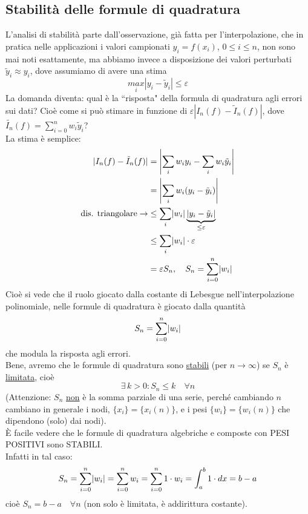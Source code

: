 \subsection{Stabilità delle formule di quadratura}
L'analisi di stabilità parte dall'osservazione, già fatta per l'interpolazione, che in pratica
nelle applicazioni i valori campionati $y_i=f(x_i)$, $0\leq i\leq n$, non sono mai noti esattamente, ma abbiamo invece a disposizione dei valori perturbati $\tilde{y}_i\approx y_i$, dove assumiamo di avere una stima 
\begin{equation*}
    \underset{i}{max}|y_i-\tilde{y}_i|\leq \varepsilon
\end{equation*}
La domanda diventa: qual è la ``risposta" della formula di quadratura agli errori sui dati? Cioè come si può stimare in funzione di $\varepsilon|I_n(f)-\tilde{I}_n(f)|$, dove $\tilde{I_n}(f)=\sum_{i=0}^nw_i\tilde{y}_i$?\\
La stima è semplice:
\[\begin{split}
    \abs{I_n(f) - \Tilde{I}_n(f)} & = \abs*{\sum_i w_i y_i - \sum_i w_i \Tilde{y}_i} \\
    & = \abs*{\sum_i w_i( y_i - \Tilde{y}_i)} \\
    \text{dis. triangolare} \to & \le \sum_i \abs*{w_i} \underbrace{\abs*{y_i - \Tilde{y}_i}}_{\le \varepsilon} \\
    & \le \sum_i \abs*{w_i} \cdot \varepsilon \\
    & = \varepsilon S_n, \quad S_n = \sum_{i=0}^n \abs*{w_i}
\end{split}\]
Cioè si vede che il ruolo giocato dalla costante di Lebesgue nell'interpolazione polinomiale, nelle formule di quadratura è giocato dalla quantità
\[S_n = \sum_{i=0}^n \abs*{w_i}\]
che modula la risposta agli errori.\\
Bene, avremo che le formule di quadratura sono \uline{stabili} (per $n \to \infty$) se $S_n$ è \uline{limitata}, cioè
\[\exists\, k > 0 : S_n \le k \quad \forall n\]
(Attenzione: $S_n$ \uline{non} è la somma parziale di una serie, perché cambiando $n$ cambiano in generale i nodi, $\{x_i\} = \{x_i(n)\}$, e i pesi $\{w_i\} = \{w_i(n)\}$ che dipendono (solo) dai nodi). \\
È facile vedere che le formule di quadratura algebriche e composte con PESI POSITIVI sono STABILI.\\
Infatti in tal caso:
\[S_n = \sum_{i=0}^n \abs*{w_i} = \sum_{i=0}^n w_i = \sum_{i=0}^n 1 \cdot w_i = \int_a^b 1 \cdot dx = b - a\]
cioè $S_n = b-a \quad \forall n$ (non solo è limitata, è addirittura costante).\\
